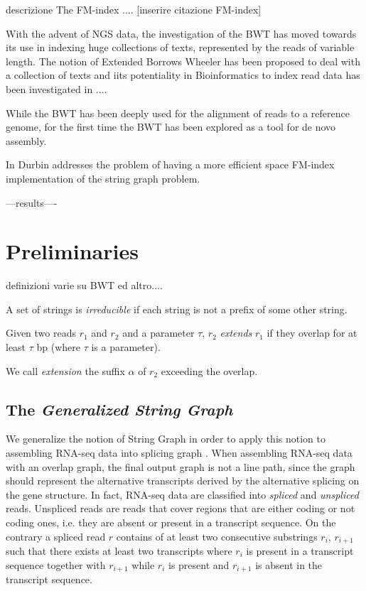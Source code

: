 \documentclass[11pt]{article}
\begin{document}
descrizione The FM-index .... [inserire citazione FM-index]
 
 With the advent of NGS data, the investigation of the BWT has moved towards its use in indexing huge collections of texts, represented by the reads of variable length.
 The notion  of Extended Borrows Wheeler has been proposed to deal with a collection of texts \cite{Bauer11} and iits potentiality in  Bioinformatics  to index read data has been investigated in ....
 
While the BWT has been deeply used for the alignment of reads to a reference genome, for the first time the BWT has been explored as a tool for de novo assembly.
 
In \cite{Simpson10} Durbin addresses the problem of having a more efficient space FM-index implementation of the string graph problem.

---results----





\section{Preliminaries}


definizioni varie su BWT ed altro....


A set of strings is \emph{irreducible} if each string is not a prefix of some other string.
\begin{definition}
Given two reads $r_1$ and $r_2$ and a parameter $\tau$, $r_2$ \emph{extends} $r_1$ if they overlap for at least $\tau$ bp (where $\tau$ is a parameter). 
\end{definition}
We call \emph{extension} the suffix $\alpha$ of $r_2$ exceeding the overlap.

\subsection*{The \emph{Generalized String Graph}}

We generalize the notion of String Graph in order to apply this notion to   assembling RNA-seq data into splicing graph \cite{Simpson10, Simpson12}. 
When assembling RNA-seq data with an overlap graph, the final output graph is not a line path, since the graph should represent the alternative transcripts derived by the alternative splicing  
on the gene structure. In fact, RNA-seq data are classified into {\em spliced} and  {\em  unspliced} reads. Unspliced reads are reads that cover regions that are either coding or not coding ones, i.e. they are absent or present in a transcript sequence. On the contrary a  spliced read $r$ contains  of  at least two consecutive substrings   $r_i $, $r_{i+1}$ such that  there exists at least two transcripts where  $r_i$ is present in a transcript sequence  together with $r_{i+1}$ while $r_i$ is present and $r_{i+1}$ is absent in the transcript sequence.
\end{document}

